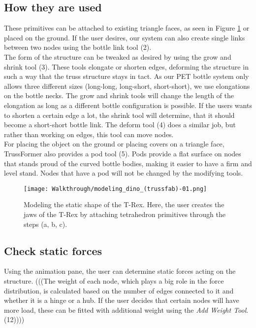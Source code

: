 \subsection{How they are used}
These primitives can be attached to existing triangle faces, as seen in Figure \ref{fig:modelling_t-rex} or placed on the ground. If the user desires, our system can also create single links between two nodes using the bottle link tool (2).\\
The form of the structure can be tweaked as desired by using the grow and shrink tool (3). These tools elongate or shorten edges, deforming the structure in such a way that the truss structure stays in tact. As our PET bottle system only allows three different sizes (long-long, long-short, short-short), we use elongations on the bottle necks. The grow and shrink tools will change the length of the elongation as long as a different bottle configuration is possible. If the users wants to shorten a certain edge a lot, the shrink tool will determine, that it should become a short-short bottle link. The deform tool (4) does a similar job, but rather than working on edges, this tool can move nodes.\\
For placing the object on the ground or placing covers on a triangle face, TrussFormer also provides a pod tool (5). Pods provide a flat surface on nodes that stands proud of the curved bottle bodies, making it easier to have a firm and level stand. Nodes that have a pod will not be changed by the modifying tools.

\begin{figure}[h!]
    \texttt{[image: Walkthrough/modeling\_dino\_(trussfab)-01.png]}
    \centering
    \caption{Modeling the static shape of the T-Rex. Here, the user creates the jaws of the T-Rex by attaching tetrahedron primitives through the steps (a, b, c).}
    \label{fig:modelling_t-rex}
\end{figure}

\subsection{Check static forces} 
Using the animation pane, the user can determine static forces acting on the structure.
(((The weight of each node, which plays a big role in the force distribution, is calculated based on the number of edges connected to it and whether it is a hinge or a hub. If the user decides that certain nodes will have more load, these can be fitted with additional weight using the \textit{Add Weight Tool}. (12))))

